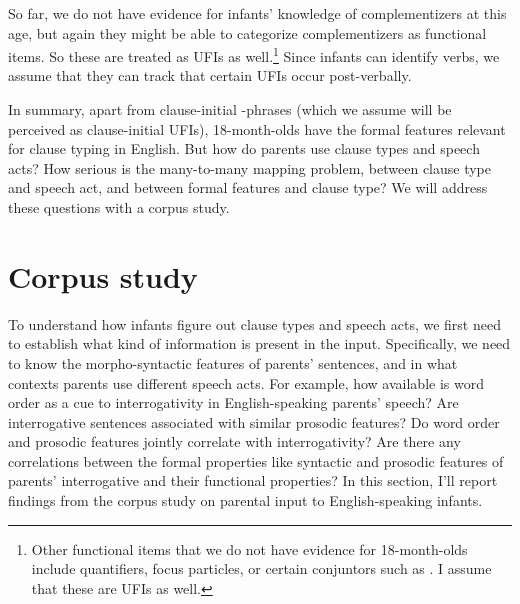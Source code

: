  So far, we do not have evidence for infants' knowledge of complementizers at this age, but again they might be able to categorize complementizers as functional items. So these are treated as UFIs as well.\footnote{ Other functional items that we do not have evidence for 18-month-olds include quantifiers, focus particles, or certain conjuntors such as . I assume that these are UFIs as well. } Since infants can identify verbs, we assume that they can track that certain UFIs occur post-verbally. 





In summary, apart from clause-initial \twh-phrases (which we assume will be perceived as clause-initial UFIs), 18-month-olds have the formal features relevant for clause typing in English. But how do parents use clause types and speech acts? How serious is the many-to-many mapping problem, between clause type and speech act, and between formal features and clause type? We will address these questions with a corpus study. %

\section{Corpus study}
\label{sec:engcl:corpus}
To understand how infants figure out clause types and speech acts, we first need to establish what kind of information is present in the input. Specifically, we need to know the morpho-syntactic features of parents’ sentences, and in what contexts parents use different speech acts. For example, how available is word order as a cue to interrogativity in English-speaking parents’ speech? Are interrogative sentences associated with similar prosodic features? Do word order and prosodic features jointly correlate with interrogativity? Are there any correlations between the formal properties like syntactic and prosodic features of parents’ interrogative and their functional properties? In this section, I’ll report findings from the corpus study on parental input to English-speaking infants. 


